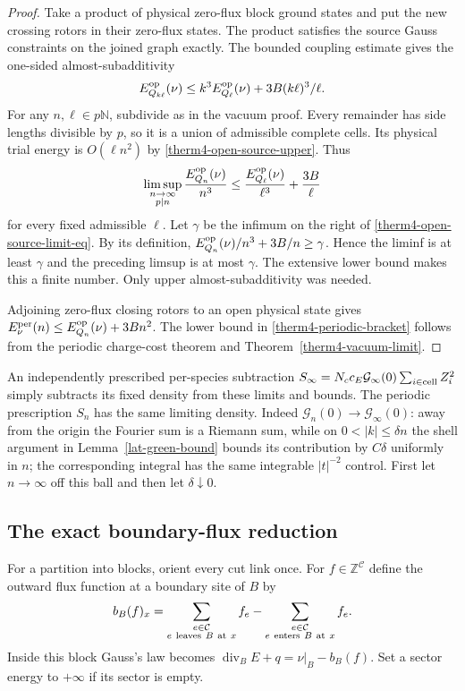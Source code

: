 \begin{proof}
Take a product of physical zero-flux block ground states and put the
new crossing rotors in their zero-flux states.  The product satisfies
the source Gauss constraints on the joined graph exactly.  The
bounded coupling estimate gives the one-sided almost-subadditivity
\[
 E_{Q_{k\ell}}^{\rm op}(\nu)
 \le k^3E_{Q_\ell}^{\rm op}(\nu)+3B(k\ell)^3/\ell.
\]
For any $n,\ell\in p\mathbb N$, subdivide as in the vacuum proof.
Every remainder has side lengths divisible by $p$, so it is a union
of admissible complete cells.  Its physical trial energy is
$O(\ell n^2)$ by \eqref{therm4-open-source-upper}.  Thus
\[
 \limsup_{\substack{n\to\infty\\p\mid n}}
 \frac{E_{Q_n}^{\rm op}(\nu)}{n^3}
 \le\frac{E_{Q_\ell}^{\rm op}(\nu)}{\ell^3}+\frac{3B}{\ell}
\]
for every fixed admissible $\ell$.  Let $\gamma$ be the infimum on
the right of \eqref{therm4-open-source-limit-eq}.  By its definition,
$E_{Q_n}^{\rm op}(\nu)/n^3+3B/n\ge\gamma$.  Hence the liminf is
at least $\gamma$ and the preceding limsup is at most $\gamma$.
The extensive lower bound makes this a finite number.
Only upper almost-subadditivity was needed.

Adjoining zero-flux closing rotors to an open physical state gives
$E_\nu^{\rm per}(n)\le E_{Q_n}^{\rm op}(\nu)+3Bn^2$.
The lower bound in \eqref{therm4-periodic-bracket} follows from the
periodic charge-cost theorem and Theorem~\ref{therm4-vacuum-limit}.
\end{proof}

An independently prescribed per-species subtraction
$S_\infty=N_c c_E\mathcal G_\infty(0)\sum_{i\in{\rm cell}}Z_i^2$
simply subtracts its fixed density from these limits and bounds.
The periodic prescription $S_n$ has the same limiting density.
Indeed $\mathcal G_n(0)\to\mathcal G_\infty(0)$: away from the origin
the Fourier sum is a Riemann sum, while on $0<|k|\le\delta n$
the shell argument in Lemma~\ref{lat-green-bound} bounds its
contribution by $C\delta$ uniformly in $n$; the corresponding integral
has the same integrable $|t|^{-2}$ control.  First let $n\to\infty$
off this ball and then let $\delta\downarrow0$.

\subsection{The exact boundary-flux reduction}

For a partition into blocks, orient every cut link once.  For
$f\in\mathbb Z^{\mathcal C}$ define the outward flux function at a
boundary site of $B$ by
\[
 b_B(f)_x=\sum_{\substack{e\in\mathcal C\\e\ {\rm leaves}\ B\ {\rm at}\ x}}
 f_e-\sum_{\substack{e\in\mathcal C\\e\ {\rm enters}\ B\ {\rm at}\ x}}f_e.
\]
Inside this block Gauss's law becomes
$\operatorname{div}_BE+q=\nu|_B-b_B(f)$.
Set a sector energy to $+\infty$ if its sector is empty.

